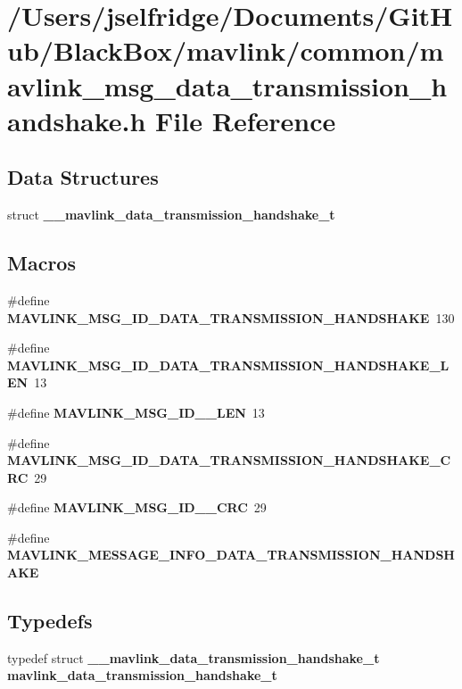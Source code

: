 \section{/\+Users/jselfridge/\+Documents/\+Git\+Hub/\+Black\+Box/mavlink/common/mavlink\+\_\+msg\+\_\+data\+\_\+transmission\+\_\+handshake.h File Reference}
\label{mavlink__msg__data__transmission__handshake_8h}
\subsection*{Data Structures}
\begin{DoxyCompactItemize}
\item 
struct \textbf{ \+\_\+\+\_\+mavlink\+\_\+data\+\_\+transmission\+\_\+handshake\+\_\+t}
\end{DoxyCompactItemize}
\subsection*{Macros}
\begin{DoxyCompactItemize}
\item 
\#define \textbf{ M\+A\+V\+L\+I\+N\+K\+\_\+\+M\+S\+G\+\_\+\+I\+D\+\_\+\+D\+A\+T\+A\+\_\+\+T\+R\+A\+N\+S\+M\+I\+S\+S\+I\+O\+N\+\_\+\+H\+A\+N\+D\+S\+H\+A\+KE}~130
\item 
\#define \textbf{ M\+A\+V\+L\+I\+N\+K\+\_\+\+M\+S\+G\+\_\+\+I\+D\+\_\+\+D\+A\+T\+A\+\_\+\+T\+R\+A\+N\+S\+M\+I\+S\+S\+I\+O\+N\+\_\+\+H\+A\+N\+D\+S\+H\+A\+K\+E\+\_\+\+L\+EN}~13
\item 
\#define \textbf{ M\+A\+V\+L\+I\+N\+K\+\_\+\+M\+S\+G\+\_\+\+I\+D\+\_\+\_\+\+L\+EN}~13
\item 
\#define \textbf{ M\+A\+V\+L\+I\+N\+K\+\_\+\+M\+S\+G\+\_\+\+I\+D\+\_\+\+D\+A\+T\+A\+\_\+\+T\+R\+A\+N\+S\+M\+I\+S\+S\+I\+O\+N\+\_\+\+H\+A\+N\+D\+S\+H\+A\+K\+E\+\_\+\+C\+RC}~29
\item 
\#define \textbf{ M\+A\+V\+L\+I\+N\+K\+\_\+\+M\+S\+G\+\_\+\+I\+D\+\_\+\_\+\+C\+RC}~29
\item 
\#define \textbf{ M\+A\+V\+L\+I\+N\+K\+\_\+\+M\+E\+S\+S\+A\+G\+E\+\_\+\+I\+N\+F\+O\+\_\+\+D\+A\+T\+A\+\_\+\+T\+R\+A\+N\+S\+M\+I\+S\+S\+I\+O\+N\+\_\+\+H\+A\+N\+D\+S\+H\+A\+KE}
\end{DoxyCompactItemize}
\subsection*{Typedefs}
\begin{DoxyCompactItemize}
\item 
typedef struct \textbf{ \+\_\+\+\_\+mavlink\+\_\+data\+\_\+transmission\+\_\+handshake\+\_\+t} \textbf{ mavlink\+\_\+data\+\_\+transmission\+\_\+handshake\+\_\+t}
\end{DoxyCompactItemize}


